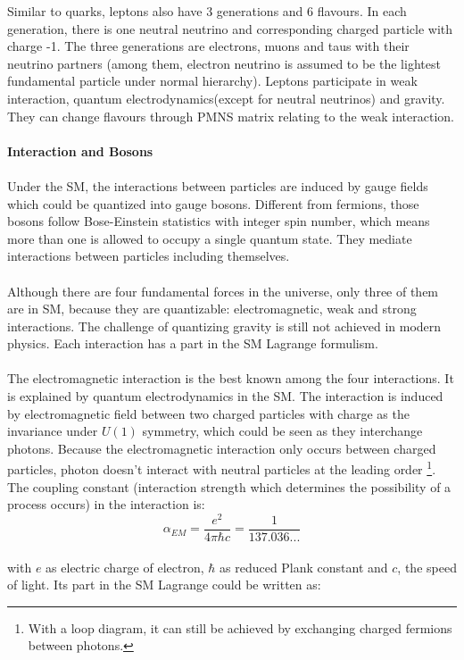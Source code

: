 Similar to quarks, leptons also have 3 generations and 6 flavours. In each generation, there is one neutral neutrino and corresponding charged particle with charge -1. The three generations are electrons, muons and taus with their neutrino partners (among them, electron neutrino is assumed to be the lightest fundamental particle under normal hierarchy). Leptons participate in weak interaction, quantum electrodynamics(except for neutral neutrinos) and gravity. They can change flavours through PMNS matrix relating to the weak interaction.
\\
\\{\bf Interaction and Bosons}
\\
\\Under the SM, the interactions between particles are induced by gauge fields which could be quantized into gauge bosons. Different from fermions, those bosons follow Bose-Einstein statistics with integer spin number, which means more than one is allowed to occupy a single quantum state. They mediate interactions between particles including themselves. 
\\
\\Although there are four fundamental forces in the universe, only three of them are in SM, because they are quantizable: electromagnetic, weak and strong interactions. The challenge of quantizing gravity is still not achieved in modern physics. Each interaction has a part in the SM Lagrange formulism.
\\
\\The electromagnetic interaction is the best known among the four interactions. It is explained by quantum electrodynamics in the SM. The interaction is induced by electromagnetic field between two charged particles with charge as the invariance under $U(1)$ symmetry, which could be seen as they interchange photons. Because the electromagnetic interaction only occurs between charged particles, photon doesn't interact with neutral particles at the leading order \footnote{With a loop diagram, it can still be achieved by exchanging charged fermions between photons.}. The coupling constant (interaction strength which determines the possibility of a process  occurs) in the interaction is:
\\
\begin{equation}
\alpha_{EM} = \frac{e^2}{4\pi\hbar c}=\frac{1}{137.036...}
\end{equation}
\\
with $e$ as electric charge of electron, $\hbar$ as reduced Plank constant and $c$, the speed of light. Its part in the SM Lagrange could be written as:
